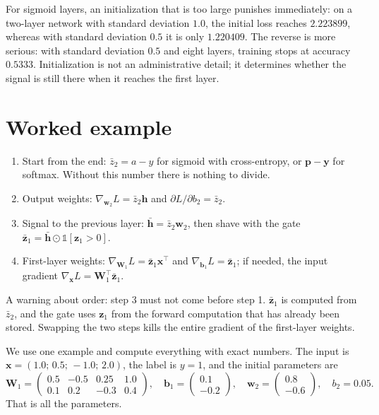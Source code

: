 For sigmoid layers, an initialization that is too large punishes immediately: on a two-layer
network with standard deviation $1.0$, the initial loss reaches $2.223899$, whereas with standard
deviation $0.5$ it is only $1.220409$. The reverse is more serious: with standard deviation $0.5$
and eight layers, training stops at accuracy $0.5333$. Initialization is not an administrative
detail; it determines whether the signal is still there when it reaches the first layer.

\section{Worked example}

\begin{resep}
\begin{enumerate}
  \item Start from the end: $\bar{z}_{2}=a-y$ for sigmoid with cross-entropy, or
        $\mathbf{p}-\mathbf{y}$ for softmax. Without this number there is nothing to divide.
  \item Output weights: $\nabla_{\mathbf{w}_{2}}L=\bar{z}_{2}\mathbf{h}$ and
        $\partial L/\partial b_{2}=\bar{z}_{2}$.
  \item Signal to the previous layer: $\bar{\mathbf{h}}=\bar{z}_{2}\mathbf{w}_{2}$, then shave
        with the gate
        $\bar{\mathbf{z}}_{1}=\bar{\mathbf{h}}\odot\mathbb{1}[\mathbf{z}_{1}>0]$.
  \item First-layer weights: $\nabla_{\mathbf{W}_{1}}L=\bar{\mathbf{z}}_{1}\mathbf{x}^{\top}$
        and $\nabla_{\mathbf{b}_{1}}L=\bar{\mathbf{z}}_{1}$; if needed, the input gradient
        $\nabla_{\mathbf{x}}L=\mathbf{W}_{1}^{\top}\bar{\mathbf{z}}_{1}$.
\end{enumerate}
A warning about order: step 3 must not come before step 1. $\bar{\mathbf{z}}_{1}$ is computed
from $\bar{z}_{2}$, and the gate uses $\mathbf{z}_{1}$ from the forward computation that has
already been stored. Swapping the two steps kills the entire gradient of the first-layer weights.
\end{resep}


We use one example and compute everything with exact numbers. The input is
$\mathbf{x}=(1.0;\,0.5;\,-1.0;\,2.0)$, the label is $y=1$, and the initial parameters are
\[
  \mathbf{W}_{1}=\begin{pmatrix}
  0.5&-0.5&0.25&1.0\\
  0.1&0.2&-0.3&0.4\end{pmatrix},\quad
  \mathbf{b}_{1}=\begin{pmatrix}0.1\\-0.2\end{pmatrix},\quad
  \mathbf{w}_{2}=\begin{pmatrix}0.8\\-0.6\end{pmatrix},\quad b_{2}=0.05 .
\]
That is all the parameters.

